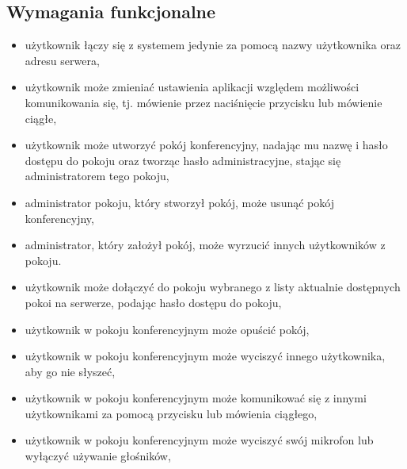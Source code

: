 \documentclass[12pt,a4paper,notitlepage]{report}
\begin{document}
	\subsection{Wymagania funkcjonalne}
	\begin{itemize}
		\item użytkownik łączy się z systemem jedynie za pomocą nazwy użytkownika oraz adresu serwera,
		\item użytkownik może zmieniać ustawienia aplikacji względem możliwości komunikowania się, tj. mówienie przez naciśnięcie przycisku lub mówienie ciągłe,
		\item użytkownik może utworzyć pokój konferencyjny, nadając mu nazwę i hasło dostępu do pokoju oraz tworząc hasło administracyjne, stając się administratorem tego pokoju,
		\item administrator pokoju, który stworzył pokój, może usunąć pokój konferencyjny,
		\item administrator, który założył pokój, może wyrzucić innych użytkowników z pokoju.
		\item użytkownik może dołączyć do pokoju wybranego z listy aktualnie dostępnych pokoi na serwerze, podając hasło dostępu do pokoju,
		\item użytkownik w pokoju konferencyjnym może opuścić pokój,
		\item użytkownik w pokoju konferencyjnym może wyciszyć innego użytkownika, aby go nie słyszeć,
		\item użytkownik w pokoju konferencyjnym może komunikować się z innymi użytkownikami za pomocą przycisku lub mówienia ciągłego,
		\item użytkownik w pokoju konferencyjnym może wyciszyć swój mikrofon lub wyłączyć używanie głośników,
		
	\end{itemize}
\end{document}
